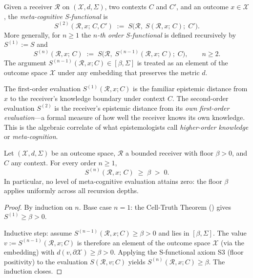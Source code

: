 \begin{definition}
\label{def:ch02-meta-sfunc}
Given a receiver $\mathcal{R}$ on $(\mathcal{X}, d, \Sigma)$, two contexts $C$
and $C'$, and an outcome $x \in \mathcal{X}$, the \emph{meta-cognitive
S-functional} is
\[
  S^{(2)}(\mathcal{R}, x;\, C, C')
  \;:=\;
  S\!\bigl(\mathcal{R},\; S(\mathcal{R}, x;\, C);\; C'\bigr).
\]
More generally, for $n \geq 1$ the \emph{$n$-th order S-functional} is defined
recursively by $S^{(1)} := S$ and
\[
  S^{(n)}(\mathcal{R}, x;\, C)
  \;:=\;
  S\!\bigl(\mathcal{R},\; S^{(n-1)}(\mathcal{R}, x;\, C);\; C\bigr),
  \qquad n \geq 2.
\]
The argument $S^{(n-1)}(\mathcal{R}, x; C) \in [\beta, \Sigma]$ is treated as an
element of the outcome space $\mathcal{X}$ under any embedding that preserves
the metric $d$.
\end{definition}

\begin{remark}
\label{rem:ch02-meta-interpretation}
The first-order evaluation $S^{(1)}(\mathcal{R}, x; C)$ is the familiar
epistemic distance from $x$ to the receiver's knowledge boundary under context
$C$.  The second-order evaluation $S^{(2)}$ is the receiver's epistemic distance
from its \emph{own first-order evaluation}---a formal measure of how well the
receiver knows its own knowledge.  This is the algebraic correlate of what
epistemologists call \emph{higher-order knowledge} or \emph{meta-cognition}.
\end{remark}

\begin{theorem}
\label{thm:ch02-no-privileged-level}
Let $(\mathcal{X}, d, \Sigma)$ be an outcome space, $\mathcal{R}$ a bounded
receiver with floor $\beta > 0$, and $C$ any context.  For every order
$n \geq 1$,
\[
  S^{(n)}(\mathcal{R}, x;\, C) \;\geq\; \beta \;>\; 0.
\]
In particular, no level of meta-cognitive evaluation attains zero: the floor
$\beta$ applies uniformly across all recursion depths.
\end{theorem}

\begin{proof}
By induction on $n$.  Base case $n = 1$: the Cell-Truth Theorem
() gives $S^{(1)} \geq \beta > 0$.

Inductive step: assume $S^{(n-1)}(\mathcal{R}, x; C) \geq \beta > 0$ and
lies in $[\beta, \Sigma]$.  The value $v := S^{(n-1)}(\mathcal{R}, x; C)$ is
therefore an element of the outcome space $\mathcal{X}$ (via the embedding) with
$d(v, \partial\mathcal{X}) \geq \beta > 0$.  Applying the S-functional axiom
S3 (floor positivity) to the evaluation $S(\mathcal{R}, v; C)$ yields
$S^{(n)}(\mathcal{R}, x; C) \geq \beta$.  The induction closes.
\end{proof}

